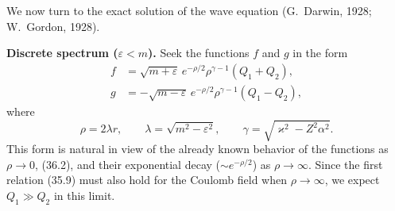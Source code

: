 We now turn to the exact solution of the wave equation (G.~Darwin, 1928; W.~Gordon, 1928).

\textbf{Discrete spectrum ($\varepsilon<m$).} Seek the functions $f$ and $g$ in the form
\begin{equation}
\begin{aligned}
f&=\sqrt{m+\varepsilon}\,e^{-\rho/2}\rho^{\gamma-1}(Q_1+Q_2),\\
g&=-\sqrt{m-\varepsilon}\,e^{-\rho/2}\rho^{\gamma-1}(Q_1-Q_2),
\end{aligned}
\tag{36.3}
\end{equation}
where
\begin{equation}
\rho=2\lambda r,
\qquad
\lambda=\sqrt{m^2-\varepsilon^2},
\qquad
\gamma=\sqrt{\varkappa^2-Z^2\alpha^2}.
\tag{36.4}
\end{equation}
This form is natural in view of the already known behavior of the functions as $\rho\to0$, (36.2), and their exponential decay ($\sim e^{-\rho/2}$) as $\rho\to\infty$. Since the first relation (35.9) must also hold for the Coulomb field when $\rho\to\infty$, we expect $Q_1\gg Q_2$ in this limit.

